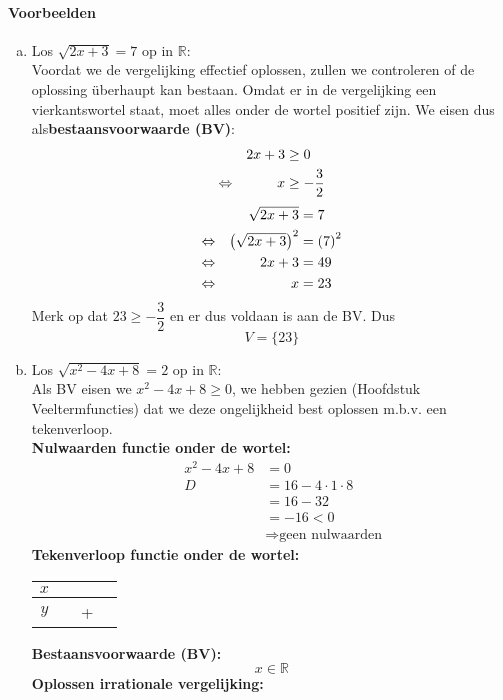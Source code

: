 \documentclass[12pt,twoside]{article}
\begin{document}
\paragraph*{Voorbeelden}
\begin{enumerate}[(a)]
  \item Los $\sqrt{2x+3}=7$ op in $\mathbb{R}$:\\
  Voordat we de vergelijking effectief oplossen, zullen we controleren of de oplossing überhaupt kan bestaan. Omdat er in de vergelijking een vierkantswortel staat, moet alles onder de wortel positief zijn. We eisen dus als{\bf bestaansvoorwaarde (BV)}:
  \begin{align*}
         && 2x+3 &\geq 0 \\
    \Leftrightarrow && x &\geq -\dfrac{3}{2}
  \end{align*}
  \begin{align*}
         && \sqrt{2x+3} &= 7 \\
    \Leftrightarrow && \left(\sqrt{2x+3}\right)^2 &= \left(7\right)^2\\
    \Leftrightarrow && 2x+3 &= 49\\
    \Leftrightarrow && x &= 23\\
  \end{align*}
  Merk op dat $23\geq -\dfrac{3}{2}$ en er dus voldaan is aan de BV. Dus
  $$V=\{23\}$$
  \item Los $\sqrt{x^2-4x+8}=2$ op in $\mathbb{R}$:\\
  Als BV eisen we $x^2-4x+8\geq 0$, we hebben gezien (Hoofdstuk Veeltermfuncties) dat we deze ongelijkheid best oplossen m.b.v. een tekenverloop.\\
  {\bf Nulwaarden functie onder de wortel:}
  \begin{align*}
         && x^2-4x+8 &= 0\\
         && D &= 16-4\cdot 1\cdot 8\\
         &&   &= 16-32\\
         &&   &= -16 < 0\\
         && &\Rightarrow \text{geen nulwaarden}
  \end{align*}
  {\bf Tekenverloop functie onder de wortel:}
  \begin{center}
    \begin{tabular}{c|ccc}
    $x$ & & & \\
    \hline
    $y$ & & + &
    \end{tabular}
  \end{center}
  {\bf Bestaansvoorwaarde (BV):}
  $$x\in\mathbb{R}$$
  {\bf Oplossen irrationale vergelijking:}

\end{enumerate}
\end{document}
